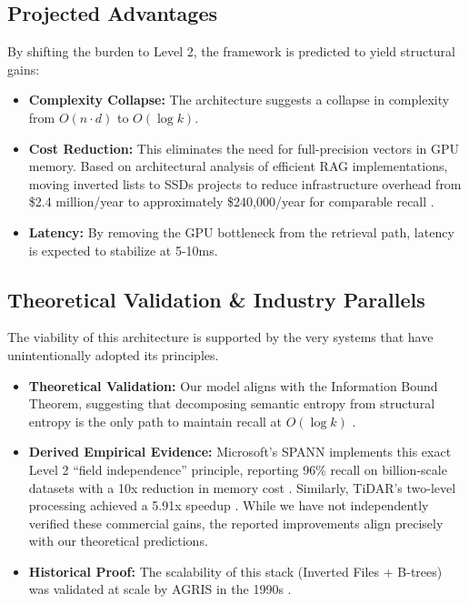 \documentclass[manuscript,screen,review]{acmart}
\begin{document}
\subsection{Projected Advantages}

By shifting the burden to Level 2, the framework is predicted to yield structural gains:
\begin{itemize}
\item \textbf{Complexity Collapse:} The architecture suggests a collapse in complexity from $O(n \cdot d)$ to $O(\log k)$.
\item \textbf{Cost Reduction:} This eliminates the need for full-precision vectors in GPU memory. Based on architectural analysis of efficient RAG implementations, moving inverted lists to SSDs projects to reduce infrastructure overhead from \$2.4 million/year to approximately \$240,000/year for comparable recall \cite{market2024}.
\item \textbf{Latency:} By removing the GPU bottleneck from the retrieval path, latency is expected to stabilize at 5-10ms.
\end{itemize}

\subsection{Theoretical Validation \& Industry Parallels}

The viability of this architecture is supported by the very systems that have unintentionally adopted its principles.
\begin{itemize}
\item \textbf{Theoretical Validation:} Our model aligns with the Information Bound Theorem, suggesting that decomposing semantic entropy from structural entropy is the only path to maintain recall at $O(\log k)$ \cite{korten2025}.
\item \textbf{Derived Empirical Evidence:} Microsoft's SPANN implements this exact Level 2 ``field independence'' principle, reporting 96\% recall on billion-scale datasets with a 10x reduction in memory cost \cite{chen2021}. Similarly, TiDAR's two-level processing achieved a 5.91x speedup \cite{liu2024}. While we have not independently verified these commercial gains, the reported improvements align precisely with our theoretical predictions.
\item \textbf{Historical Proof:} The scalability of this stack (Inverted Files + B-trees) was validated at scale by AGRIS in the 1990s \cite{fao1995}.
\end{itemize}
\end{document}
